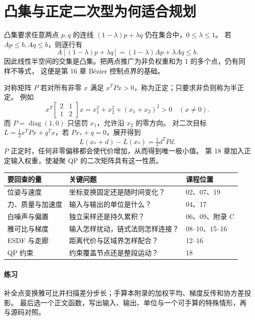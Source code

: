 \section{凸集与正定二次型为何适合规划}
凸集要求任意两点 $p,q$ 的连线 $(1-\lambda)p+\lambda q$ 仍在集合中，$0\le\lambda\le1$。
若 $Ap\le b,Aq\le b$，则逐行有
\[
 A[(1-\lambda)p+\lambda q]=(1-\lambda)Ap+\lambda Aq\le b.
\]
因此线性半空间的交集是凸集。把两点推广为非负权重和为 1 的多个点，仍有同样不等式，
这便是第 16 章 Bézier 控制点界的基础。

对称矩阵 $P$ 若对所有非零 $x$ 满足 $x^TPx>0$，称为正定；只要求非负则称为半正定。
例如
\[
 x^T\begin{bmatrix}2&1\\1&2\end{bmatrix}x
   =x_1^2+x_2^2+(x_1+x_2)^2>0\quad(x\ne0).
\]
而 $P=\operatorname{diag}(1,0)$ 只惩罚 $x_1$，允许沿 $x_2$ 的零方向。
对二次目标 $L=\tfrac12x^TPx+q^Tx$，若 $Px_*+q=0$，展开得到
\[
 L(x_*+d)-L(x_*)=\tfrac12d^TPd.
\]
$P$ 正定时，任何非零偏移都会使代价增加，从而得到唯一极小值。
第 18 章加入正定输入权重，使凝聚 QP 的二次矩阵具有这一性质。

\begin{center}\small
\begin{tabular}{lll}\toprule
要回查的量 & 关键问题 & 课程位置\\\midrule
位姿与速度 & 坐标变换固定还是随时间变化？ & 02、07、19\\
力、质量与加速度 & 输入与输出的单位是什么？ & 04、17\\
白噪声与偏置 & 独立采样还是持久累积？ & 06、09、附录 C\\
雅可比与梯度 & 输入怎样扰动，链式法则怎样连接？ & 08--10、15--16\\
ESDF 与走廊 & 距离代价与区域界怎样配合？ & 12--16\\
QP 约束 & 约束覆盖节点还是整段运动？ & 18\\\bottomrule
\end{tabular}
\end{center}
\paragraph{练习}
补全点变换雅可比并扫描差分步长；手算本附录的加权平均、梯度反传和协方差投影。
最后选一个正文函数，写出输入、输出、单位与一个可手算的特殊情形，再与源码对照。
